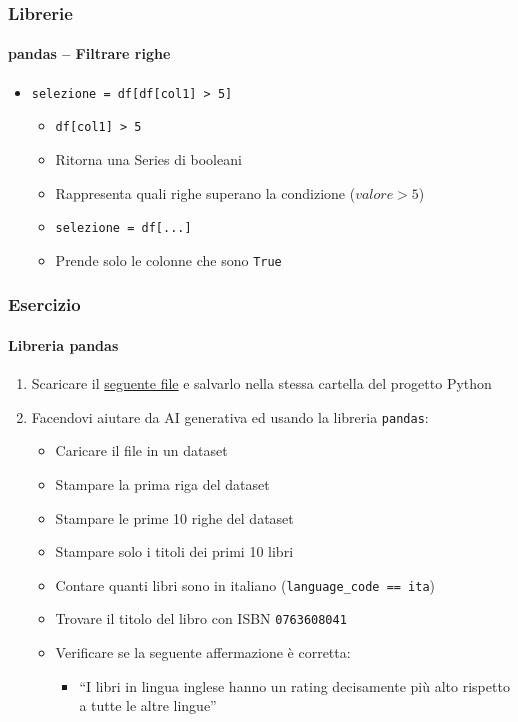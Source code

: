 \begin{exampleframe}
    \frametitle{Librerie}
    \framesubtitle{pandas -- Filtrare righe}

    \begin{itemize}
        \item \texttt{selezione = df[df[\textquotesingle{}col1\textquotesingle{}] > 5]}
        \begin{itemize}
            \item \texttt{df[\textquotesingle{}col1\textquotesingle{}] > 5}
            \item Ritorna una Series di booleani
            \item Rappresenta quali righe superano la condizione ($valore > 5$)

            \bigskip
            \item \texttt{selezione = df[...]}
            \item Prende solo le colonne che sono \texttt{True}
        \end{itemize}
    \end{itemize}
\end{exampleframe}

\begin{exerciseframe}
    \frametitle{Esercizio}
    \framesubtitle{Libreria pandas}

    \begin{enumerate}
        \item Scaricare il \href{https://raw.githubusercontent.com/DavidePonzini/didattica/refs/heads/main/books.csv}{seguente file} e salvarlo nella stessa cartella del progetto Python
    
        \bigskip
        \item Facendovi aiutare da AI generativa ed usando la libreria \texttt{pandas}:
        \begin{itemize}
            \item Caricare il file in un dataset
            \item Stampare la prima riga del dataset
            \item Stampare le prime 10 righe del dataset
            \item Stampare solo i titoli dei primi 10 libri
            \item Contare quanti libri sono in italiano (\texttt{language\_code == \textquotesingle{}ita\textquotesingle{}})
            \item Trovare il titolo del libro con ISBN \texttt{0763608041}

            \pause
            \bigskip
            \item Verificare se la seguente affermazione è corretta:
            \begin{itemize}
                \item ``I libri in lingua inglese hanno un rating decisamente più alto rispetto a tutte le altre lingue''
            \end{itemize}
        \end{itemize}
    \end{enumerate}
\end{exerciseframe}


